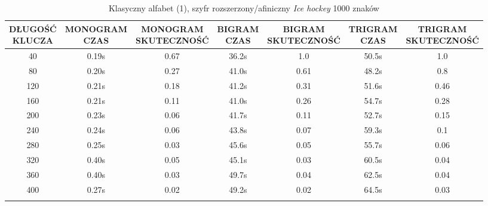 \documentclass[a4paper]{article}
\theoremstyle{defn}
\theoremstyle{theorem}
\theoremstyle{lemma}
\theoremstyle{cor}
\theoremstyle{fact}
\begin{document}
\begin{center}\begin{small}\begin{longtable}{|c|c|c|c|c|c|c|}
\hline \makecell{DŁUGOŚĆ\\KLUCZA} &  \makecell{MONOGRAM\\CZAS} & \makecell{MONOGRAM\\SKUTECZNOŚĆ} & \makecell{BIGRAM\\CZAS} &  \makecell{BIGRAM\\SKUTECZNOŚĆ} & \makecell{TRIGRAM\\CZAS} & \makecell{TRIGRAM\\SKUTECZNOŚĆ}\\ \hline
40 & 0.19s & 0.67 & 36.2s & 1.0 & 50.5s & 1.0 \\ \hline
80 & 0.20s & 0.27 & 41.0s & 0.61 & 48.2s & 0.8 \\ \hline
120 & 0.21s & 0.18 & 41.2s & 0.31 & 51.6s & 0.46 \\ \hline
160 & 0.21s & 0.11 & 41.0s & 0.26 & 54.7s & 0.28 \\ \hline
200 & 0.23s & 0.06 & 41.7s & 0.11 & 52.7s & 0.15 \\ \hline
240 & 0.24s & 0.06 & 43.8s & 0.07 & 59.3s & 0.1 \\ \hline
280 & 0.25s & 0.03 & 45.6s & 0.05 & 55.7s & 0.06 \\ \hline
320 & 0.40s & 0.05 & 45.1s & 0.03 & 60.5s & 0.04 \\ \hline
360 & 0.40s & 0.03 & 49.7s & 0.04 & 62.5s & 0.04 \\ \hline
400 & 0.27s & 0.02 & 49.2s & 0.02 & 64.5s & 0.03 \\ \hline
\caption{Klasyczny alfabet (1), szyfr rozszerzony/afiniczny \textit{Ice hockey} 1000 znaków}
\end{longtable}\end{small}\end{center}
\end{document}

